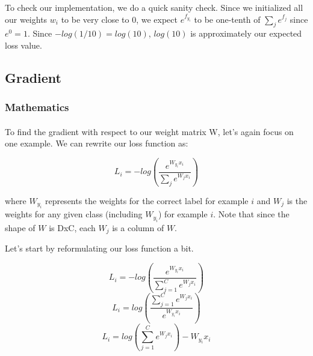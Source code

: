 \documentclass[12pt]{article}
\begin{document}
To check our implementation, we do a quick sanity check. 
Since we initialized all our weights $w_{i}$ to be very close to 0, we
expect $e^{f_{y_{i}}}$ to be one-tenth of $\sum_{j} e^{f_{j}}$ since 
$e^{0} = 1$. Since $-log(1/10) = log(10)$, $log(10)$ is approximately our 
expected loss value. 

\subsection{Gradient}

\subsubsection{Mathematics}
\paragraph{}
To find the gradient with respect to our weight 
matrix W, let's again focus on one example. We can rewrite our loss function as:

\begin{equation}
    L_{i} = -log(\frac{e^{W_{y_{i}}x_{i}}}{\sum_{j} e^{W_{j}x_{i}}}) 
\end{equation}

where $W_{y_{i}}$ represents the weights for the correct label for example $i$ and $W_{j}$ 
is the weights for any given class (including $W_{y_{i}}$) for example $i$. 
Note that since the shape 
of $W$ is DxC, each $W_{j}$ is a column of $W$. 

Let's start by reformulating our loss function a bit.

\begin{equation}
    L_{i} = -log(\frac{e^{W_{y_{i}}x_{i}}}{\sum_{j=1}^C e^{W_{j}x_{i}}}) 
\end{equation}
\begin{equation}
    L_{i} = log(\frac{\sum_{j=1}^C e^{W_{j}x_{i}}}{e^{W_{y_{i}}x_{i}}}) 
\end{equation}
\begin{equation}
    L_{i} = log({\sum_{j=1}^C e^{W_{j}x_{i}}}) - W_{y_{i}}x_{i}
\end{equation}
\end{document}
